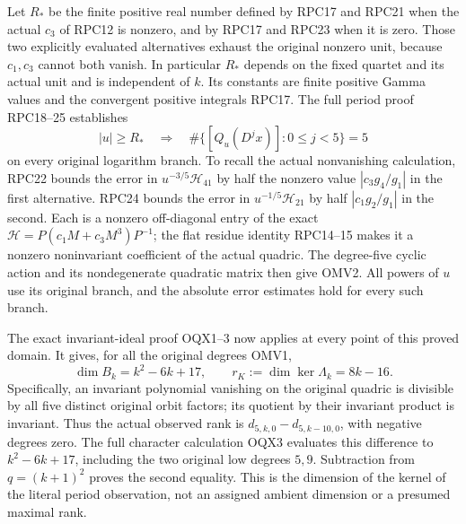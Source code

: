 \documentclass[11pt,a4paper]{article}
\begin{document}
Let $R_*$ be the finite positive real number defined by RPC17 and
RPC21 when the actual $c_3$ of RPC12 is nonzero, and by RPC17 and
RPC23 when it is zero. Those two explicitly evaluated alternatives
exhaust the original nonzero unit, because $c_1,c_3$ cannot both
vanish. In particular $R_*$ depends on the fixed quartet and its
actual unit and is independent of $k$. Its constants are finite
positive Gamma values and the convergent positive integrals RPC17.
The full period proof RPC18--25 establishes
\[
 |u|\geq R_*\quad\Longrightarrow\quad
 \#\{[Q_u(D^j x)]:0\leq j<5\}=5
 \tag{OMV2}
\]
on every original logarithm branch. To recall the actual nonvanishing
calculation, RPC22 bounds the error in
$u^{-3/5}\mathcal H_{41}$ by half the nonzero value
$|c_3g_4/g_1|$ in the first alternative. RPC24 bounds the error
in $u^{-1/5}\mathcal H_{21}$ by half $|c_1g_2/g_1|$ in the
second. Each is a nonzero off-diagonal entry of the exact
$\mathcal H=P(c_1M+c_3M^3)P^{-1}$; the flat residue identity
RPC14--15 makes it a nonzero noninvariant coefficient of the actual
quadric. The degree-five cyclic action and its nondegenerate
quadratic matrix then give OMV2. All powers of $u$ use its original
branch, and the absolute error estimates hold for every such branch.

The exact invariant-ideal proof OQX1--3 now applies at every point
of this proved domain. It gives, for all the original degrees OMV1,
\[
 \boxed{\quad \dim B_k=k^2-6k+17,\qquad
                 r_K:=\dim\ker\Lambda_k=8k-16.\quad}
 \tag{OMV3}
\]
Specifically, an invariant polynomial vanishing on the original
quadric is divisible by all five distinct original orbit factors;
its quotient by their invariant product is invariant. Thus the
actual observed rank is $d_{5,k,0}-d_{5,k-10,0}$, with negative
degrees zero. The full character calculation OQX3 evaluates this
difference to $k^2-6k+17$, including the two original low degrees
$5,9$. Subtraction from $q=(k+1)^2$ proves the second equality.
This is the dimension of the kernel of the literal period observation,
not an assigned ambient dimension or a presumed maximal rank.
\end{document}
